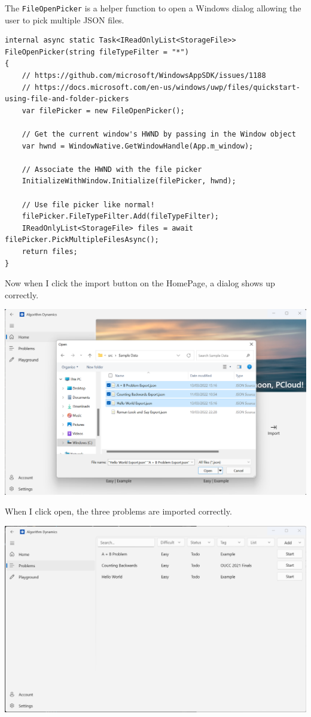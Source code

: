 \documentclass[a4paper]{report}
\newcommand{\code}{\texttt}
\begin{document}
The \code{FileOpenPicker} is a helper function to open a Windows dialog allowing the user to pick multiple JSON files.

\begin{verbatim}
internal async static Task<IReadOnlyList<StorageFile>> FileOpenPicker(string fileTypeFilter = "*")
{
    // https://github.com/microsoft/WindowsAppSDK/issues/1188
    // https://docs.microsoft.com/en-us/windows/uwp/files/quickstart-using-file-and-folder-pickers
    var filePicker = new FileOpenPicker();

    // Get the current window's HWND by passing in the Window object
    var hwnd = WindowNative.GetWindowHandle(App.m_window);

    // Associate the HWND with the file picker
    InitializeWithWindow.Initialize(filePicker, hwnd);

    // Use file picker like normal!
    filePicker.FileTypeFilter.Add(fileTypeFilter);
    IReadOnlyList<StorageFile> files = await filePicker.PickMultipleFilesAsync();
    return files;
}
\end{verbatim}

Now when I click the import button on the HomePage, a dialog shows up correctly.

\includegraphics[width=\textwidth, height=\textheight, keepaspectratio]{HomePage-Import}

When I click open, the three problems are imported correctly.

\includegraphics[width=\textwidth, height=\textheight, keepaspectratio]{ProblemsPage-Import}
\end{document}
